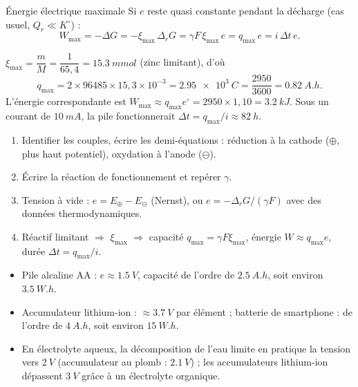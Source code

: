 \begin{resultat}{Énergie électrique maximale}
Si $e$ reste quasi constante pendant la décharge (cas usuel, $Q_r \ll K^\circ$) :
\[ W_{\max} = -\Delta G = -\xi_{\max}\,\Delta_rG = \gamma F\,\xi_{\max}\,e = q_{\max}\,e = i\,\Delta t\,e. \]
\end{resultat}

\begin{exemple}
$\xi_{\max} = \dfrac{m}{M} = \dfrac{1}{65{,}4} = \SI{15,3}{mmol}$ (zinc limitant), d'où
\[ q_{\max} = 2\times96485\times15{,}3\times10^{-3} = \SI{2,95e3}{C} = \frac{2950}{3600} = \SI{0,82}{A.h}. \]
L'énergie correspondante est $W_{\max} \approx q_{\max}e^\circ = 2950\times1{,}10 = \SI{3,2}{kJ}$. Sous un courant de $\SI{10}{mA}$, la pile fonctionnerait $\Delta t = q_{\max}/i \approx \SI{82}{h}$.
\end{exemple}

\begin{methode}
\begin{enumerate}
  \item Identifier les couples, écrire les demi-équations : réduction à la cathode ($\oplus$, plus haut potentiel), oxydation à l'anode ($\ominus$).
  \item Écrire la réaction de fonctionnement et repérer $\gamma$.
  \item Tension à vide : $e = E_\oplus - E_\ominus$ (Nernst), ou $e = -\Delta_rG/(\gamma F)$ avec des données thermodynamiques.
  \item Réactif limitant $\Rightarrow$ $\xi_{\max}$ $\Rightarrow$ capacité $q_{\max} = \gamma F\xi_{\max}$, énergie $W\approx q_{\max}e$, durée $\Delta t = q_{\max}/i$.
\end{enumerate}
\end{methode}

\begin{ordres}
\begin{itemize}
  \item Pile alcaline AA : $e \approx \SI{1,5}{V}$, capacité de l'ordre de $\SI{2,5}{A.h}$, soit environ $\SI{3,5}{W.h}$.
  \item Accumulateur lithium-ion : $\approx\SI{3,7}{V}$ par élément ; batterie de smartphone : de l'ordre de $\SI{4}{A.h}$, soit environ $\SI{15}{W.h}$.
  \item En électrolyte aqueux, la décomposition de l'eau limite en pratique la tension vers $\SI{2}{V}$ (accumulateur au plomb : $\SI{2,1}{V}$) ; les accumulateurs lithium-ion dépassent $\SI{3}{V}$ grâce à un électrolyte organique.
\end{itemize}
\end{ordres}
